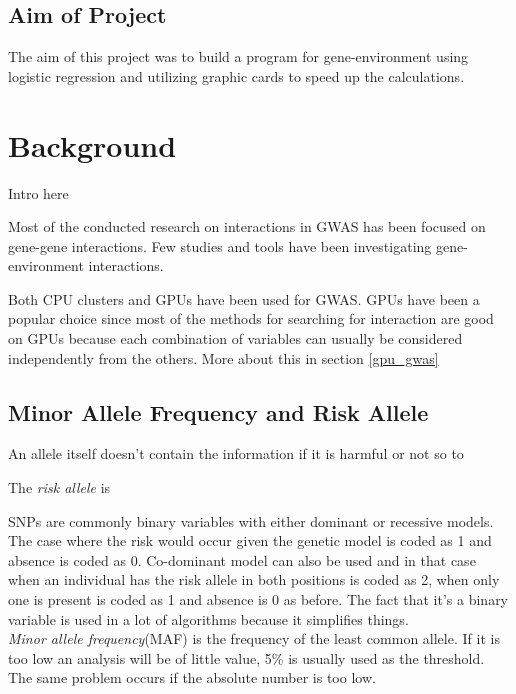 \documentclass[10pt,a4paper]{report}
\begin{document}

\section{Aim of Project}
The aim of this project was to build a program for gene-environment using logistic regression and utilizing graphic cards to speed up the calculations.

\clearpage
\chapter{Background}
Intro here

Most of the conducted research on interactions in GWAS has been focused on gene-gene interactions. Few studies and tools have been investigating gene-environment interactions.

Both CPU clusters\cite{biforce} and GPUs\cite{gwis,gboost,gmdr_gpu,cuda_lr,genie_2012,plink_gpu} have been used for GWAS. GPUs have been a popular choice since most of the methods for searching for interaction are good on GPUs because each combination of variables can usually be considered independently from the others. More about this in section \ref{gpu_gwas}


\section{Minor Allele Frequency and Risk Allele}
An allele itself doesn't contain the information if it is harmful or not so to

The \emph{risk allele} is


SNPs are commonly binary variables with either dominant or recessive models. The case where the risk would occur given the genetic model is coded as 1 and absence is coded as 0. Co-dominant model can also be used and in that case when an individual has the risk allele in both positions is coded as 2, when only one is present is coded as 1 and absence is 0 as before. The fact that it's a binary variable is used in a lot of algorithms because it simplifies things.\\



\emph{Minor allele frequency}(MAF) is the frequency of the least common allele. If it is too low an analysis will be of little value, 5\% is usually used as the threshold. The same problem occurs if the absolute number is too low.
\end{document}
